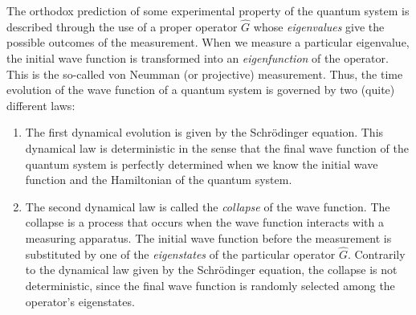 \documentclass[onecolumn,nofootinbib, secnumarabic, amsmath, nobibnotes,12pt,aps,pra]{revtex4-1}
\begin{document}
The orthodox prediction of some experimental property of the quantum system is described through the use of a proper operator $\hat{G}$ whose \textit{eigenvalues} give the possible outcomes of the measurement. When we measure a particular eigenvalue, the initial wave function is transformed into an \textit{eigenfunction} of the operator. This is the so-called von Neumman (or projective) measurement.
Thus, the time evolution of the wave function of a quantum system is governed by two (quite) different laws:
\begin{enumerate}
\item The first dynamical evolution is given by the Schr\"odinger equation. This dynamical law is deterministic in the sense that the final wave function of the quantum system is perfectly determined when we know the initial wave function and the Hamiltonian of the quantum system.

\item The second dynamical law is called the \textit{collapse} of the wave function. The collapse is a process that occurs when the wave function interacts with a measuring apparatus. The initial wave function before the measurement is substituted by one of the \textit{eigenstates} of the particular operator $\hat{G}$\!. Contrarily to the dynamical law given by the Schr\"odinger equation, the collapse is not deterministic, since the final wave function is randomly selected among the operator's eigenstates.
\end{enumerate}
\end{document}

